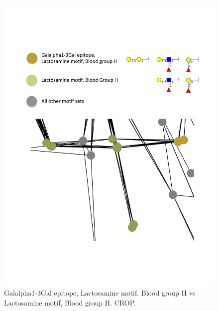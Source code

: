 \documentclass[12pt,a4paper]{article}
\begin{document}
\begin{figure}[H]
\centering 
\includegraphics[scale=0.85]{motif_similarity_exploration/Galalpha1-3Gal_epitope__Lactosamine_motif__Blood_group_H_vs_Lactosamine_motif__Blood_group_H.pdf} 
\caption{Galalpha1-3Gal epitope, Lactosamine motif, Blood group H vs Lactosamine motif, Blood group H. CROP.}
\label{fig:Galalpha1-3Gal_epitope_Lactosamine_motif_Blood_group_H_vs_Lactosamine_motif_Blood_group_H}
\end{figure}
\end{document}
